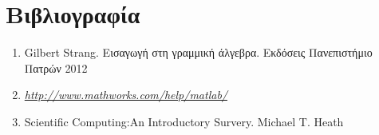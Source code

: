 \documentclass[a4paper,11pt]{article}
\begin{document}
		
	\clearpage
	\renewcommand\thesection{}
	\pagebreak
	\section{Βιβλιογραφία}	
	
	\begin{enumerate}
		\item Gilbert Strang. Εισαγωγή στη γραμμική άλγεβρα. Εκδόσεις Πανεπιστήμιο Πατρών 2012
		\item \href{http://www.mathworks.com/help/matlab/}{\textit{http://www.mathworks.com/help/matlab/}}
		\item Scientific Computing:An Introductory Survery. Michael T. Heath
	\end{enumerate}
	 	
\end{document}
